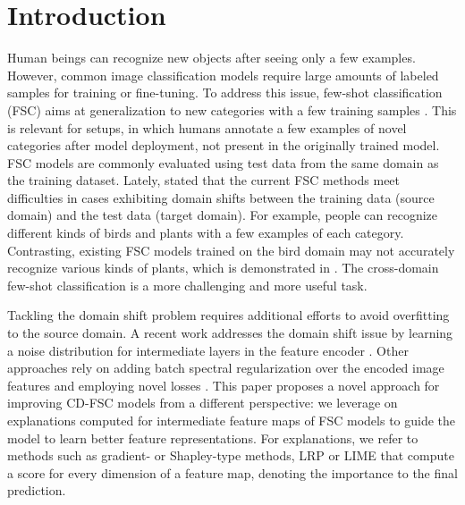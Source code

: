 \documentclass[a4paper,conference]{IEEEtran}
\begin{document}
\IEEEpeerreviewmaketitle

\section{Introduction}
\label{sec:introduction}
Human beings can recognize new objects after seeing only a few examples. However, common image classification models require large amounts of labeled samples for training or fine-tuning.
To address this issue, few-shot classification (FSC) aims at generalization to new categories with a few training samples 
\cite{MatchNet:vinyals2016matching, MAML:finn2017model, PROTO:snell2017prototypical, RN:sung2018learning, FEWGNN:garcia2018fewshot,LEO:rusu2018metalearning, MTL:sun2019meta, CAN:hou2019cross}. This is relevant for setups, in which humans annotate a few examples of novel categories after model deployment, not present in the originally trained model.
FSC models are commonly evaluated using test data from the same domain as the training dataset. Lately, \cite{ACLOSERLOOK:chen2018a} stated that the current FSC methods meet difficulties in cases exhibiting domain shifts between the training data (source domain) and the test data (target domain). 
For example, people can recognize different kinds of birds and plants with a few examples of each category. Contrasting, existing FSC models trained on the bird domain may not accurately recognize various kinds of plants, which is demonstrated in \cite{ACLOSERLOOK:chen2018a, FeaturewiseTranslayer:tseng2020cross}.
The cross-domain few-shot classification is a more challenging and more useful task.

Tackling the domain shift problem requires additional efforts to avoid overfitting to the source domain. 
A recent work addresses the domain shift issue by learning a noise distribution for intermediate layers in the feature encoder \cite{FeaturewiseTranslayer:tseng2020cross}. Other approaches rely on adding batch spectral regularization over the encoded image features \cite{BSR:liu2020feature} and employing novel losses \cite{LMM:yeh2020large, ACLOSERLOOK:chen2018a}. This paper proposes a novel approach for improving CD-FSC models from a different perspective: we leverage on explanations computed for intermediate feature maps of FSC models to guide the model to learn better feature representations. For explanations, we refer to methods such as gradient- or Shapley-type methods, LRP\cite{LRP:bach2015pixel} or LIME\cite{LIME:ribeiro2016should} that compute a score for every dimension of a feature map, denoting the importance to the final prediction.
\end{document}
